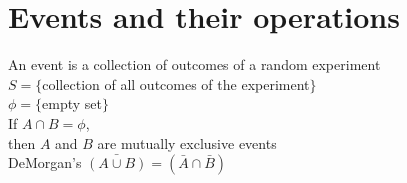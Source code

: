 \section*{Events and their operations}
An event is a collection of outcomes of a random experiment \\
$S=\{$collection of all outcomes of the experiment$\}$ \\
$\phi = \{$empty set$\}$ \\
If $A\cap B=\phi$, \\ then $A$ and $B$ are mutually exclusive events\\
DeMorgan's $\bar{(A\cup B)} = (\bar{A}\cap \bar{B})$

    

